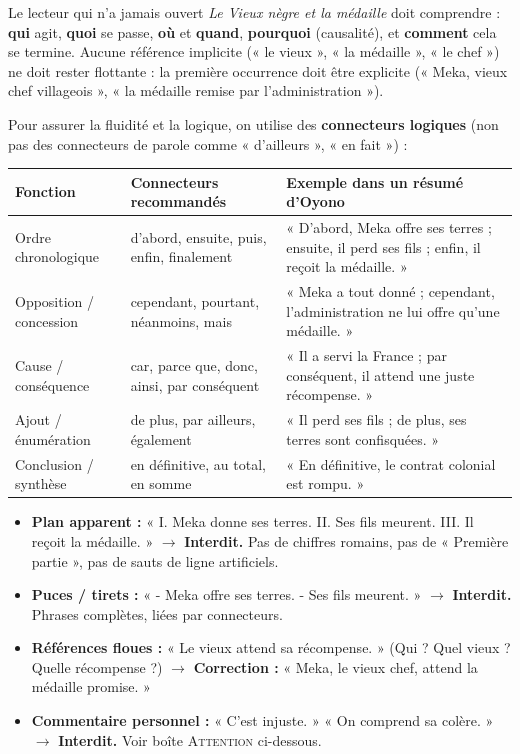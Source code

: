 \documentclass[11pt]{article}
\begin{document}
\begin{propriete}
Le lecteur qui n'a jamais ouvert \emph{Le Vieux nègre et la médaille} doit comprendre : \textbf{qui} agit, \textbf{quoi} se passe, \textbf{où} et \textbf{quand}, \textbf{pourquoi} (causalité), et \textbf{comment} cela se termine. Aucune référence implicite (« le vieux », « la médaille », « le chef ») ne doit rester flottante : la première occurrence doit être explicite (« Meka, vieux chef villageois », « la médaille remise par l'administration »).
\end{propriete}

Pour assurer la fluidité et la logique, on utilise des \textbf{connecteurs logiques} (non pas des connecteurs de parole comme « d'ailleurs », « en fait ») :

\begin{center}
\begin{tabularx}{\linewidth}{|l|X|X|}\hline
\textbf{Fonction} & \textbf{Connecteurs recommandés} & \textbf{Exemple dans un résumé d'Oyono} \\ \hline
Ordre chronologique & d'abord, ensuite, puis, enfin, finalement & « D'abord, Meka offre ses terres ; ensuite, il perd ses fils ; enfin, il reçoit la médaille. » \\ \hline
Opposition / concession & cependant, pourtant, néanmoins, mais & « Meka a tout donné ; cependant, l'administration ne lui offre qu'une médaille. » \\ \hline
Cause / conséquence & car, parce que, donc, ainsi, par conséquent & « Il a servi la France ; par conséquent, il attend une juste récompense. » \\ \hline
Ajout / énumération & de plus, par ailleurs, également & « Il perd ses fils ; de plus, ses terres sont confisquées. » \\ \hline
Conclusion / synthèse & en définitive, au total, en somme & « En définitive, le contrat colonial est rompu. » \\ \hline
\end{tabularx}
\end{center}

\begin{attention}
\begin{itemize}
    \item \textbf{Plan apparent :} « I. Meka donne ses terres. II. Ses fils meurent. III. Il reçoit la médaille. » $\to$ \textbf{Interdit.} Pas de chiffres romains, pas de « Première partie », pas de sauts de ligne artificiels.
    \item \textbf{Puces / tirets :} « - Meka offre ses terres. - Ses fils meurent. » $\to$ \textbf{Interdit.} Phrases complètes, liées par connecteurs.
    \item \textbf{Références floues :} « Le vieux attend sa récompense. » (Qui ? Quel vieux ? Quelle récompense ?) $\to$ \textbf{Correction :} « Meka, le vieux chef, attend la médaille promise. »
    \item \textbf{Commentaire personnel :} « C'est injuste. » « On comprend sa colère. » $\to$ \textbf{Interdit.} Voir boîte \textsc{Attention} ci-dessous.
\end{itemize}
\end{attention}
\end{document}

